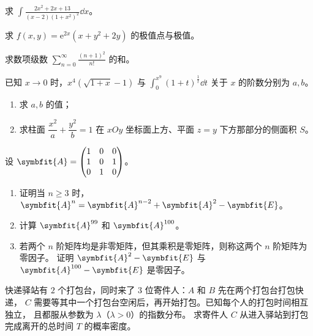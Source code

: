 \begin{question}[index=17,points=10]
求 $\displaystyle\int\frac{2x^2+2x+13}{(x-2)(1+x^2)^2}\dd x$。
\end{question}
\QuestionBreak\WorkSpace

\begin{question}[index=18,points=12]
求 $f(x,y)=\mathrm e^{2x}(x+y^2+2y)$ 的极值点与极值。
\end{question}
\QuestionBreak\WorkSpace\WorkPageBreak

\begin{question}[index=19,points=12]
求数项级数 $\displaystyle\sum_{n=0}^{\infty}\frac{(n+1)^2}{n!}$ 的和。
\end{question}
\QuestionBreak\WorkSpace

\begin{question}[index=20,points=12]
已知 $x\to0$ 时，$x^4(\sqrt{1+x}-1)$ 与
$\displaystyle\int_0^{x^9}(1+t)^{\frac{1}{t}}\dd t$ 关于 $x$ 的阶数分别为 $a,b$。
\begin{enumerate}[label=（\arabic*）,leftmargin=2.5em,labelsep=.4em,itemsep=3pt,topsep=3pt]
\item 求 $a,b$ 的值；
\item 求柱面 $\dfrac{x^2}{a}+\dfrac{y^2}{b}=1$ 在 $xOy$ 坐标面上方、平面 $z=y$ 下方那部分的侧面积 $S$。
\end{enumerate}
\end{question}
\QuestionBreak\WorkSpace\WorkPageBreak

\begin{question}[index=21,points=12]
设 $\symbfit{A}=\begin{pmatrix}1&0&0\\1&0&1\\0&1&0\end{pmatrix}$。
\begin{enumerate}[label=（\arabic*）,leftmargin=2.5em,labelsep=.4em,itemsep=3pt,topsep=3pt]
\item 证明当 $n\ge3$ 时，$\symbfit{A}^n=\symbfit{A}^{n-2}+\symbfit{A}^2-\symbfit{E}$。
\item 计算 $\symbfit{A}^{99}$ 和 $\symbfit{A}^{100}$。
\item 若两个 $n$ 阶矩阵均是非零矩阵，但其乘积是零矩阵，则称这两个 $n$ 阶矩阵为零因子。
证明 $\symbfit{A}^2-\symbfit{E}$ 与 $\symbfit{A}^{100}-\symbfit{E}$ 是零因子。
\end{enumerate}
\end{question}
\QuestionBreak\WorkSpace

\begin{question}[index=22,points=12]
快递驿站有 $2$ 个打包台，同时来了 $3$ 位寄件人：$A$ 和 $B$ 先在两个打包台打包快递，
$C$ 需要等其中一个打包台空闲后，再开始打包。已知每个人的打包时间相互独立，
且都服从参数为 $\lambda$（$\lambda>0$）的指数分布。
求寄件人 $C$ 从进入驿站到打包完成离开的总时间 $T$ 的概率密度。
\end{question}
\WorkSpace
